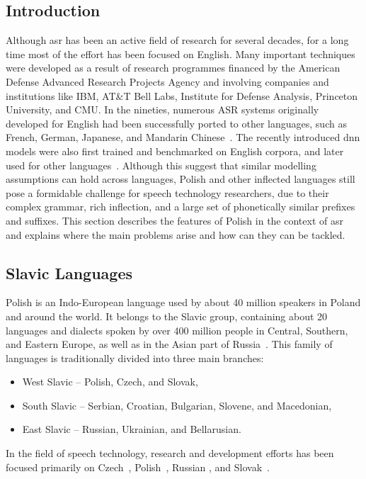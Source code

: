 \subsection{Introduction}
Although \gls{asr} has been an active field of research for several decades, for a long time most of the effort has been focused on English.  Many important techniques were developed as a result of research programmes financed by the American Defense Advanced Research Projects Agency and involving companies and institutions like IBM, AT\&T Bell Labs, Institute for Defense Analysis, Princeton University, and CMU. In the nineties, numerous ASR systems originally developed for English had been successfully ported to other languages, such as French, German, Japanese, and Mandarin Chinese~\cite{besacier2014automatic}. The recently introduced \gls{dnn} models were also first trained and benchmarked on English corpora, and later used for other languages~\cite{hinton2012deep}. Although this suggest that similar modelling assumptions can hold across languages, Polish and other inflected languages still pose a formidable challenge for speech technology researchers, due to their complex grammar, rich inflection, and a large set of phonetically similar prefixes and suffixes. This section describes the features of Polish in the context of \gls{asr} and explains where the main problems arise and how can they can be tackled.
\subsection{Slavic Languages}
Polish is an Indo-European language used by about 40 million speakers in Poland and around the world. It belongs to the Slavic group, containing about 20 languages and dialects spoken by over 400 million people in Central, Southern, and Eastern Europe, as well as in the Asian part of Russia~\cite{karpov2012speech}. This family of languages is traditionally divided into three main branches:
\begin{itemize}
\item West Slavic -- Polish, Czech, and Slovak,
\item South Slavic -- Serbian, Croatian, Bulgarian, Slovene, and Macedonian,
\item East Slavic -- Russian, Ukrainian, and Bellarusian.
\end{itemize}
In the field of speech technology, research and development efforts has been focused primarily on Czech~\cite{nouza2010adapting, oparin2008morphological}, Polish~\cite{zelasko2015linguistically, ziolko2011automatic}, Russian {\cite{karpov2012speech}}, and Slovak~\cite{lojka2009finite}.
